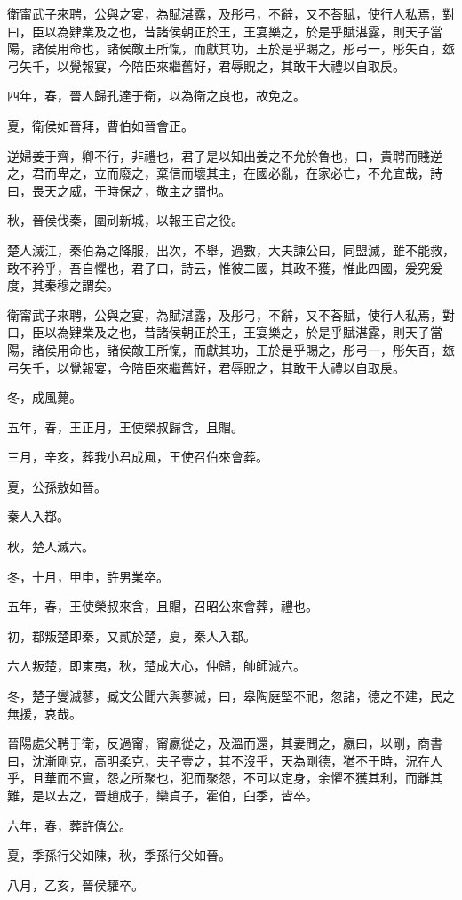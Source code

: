 \begin{pinyinscope}
衛甯武子來聘，公與之宴，為賦湛露，及彤弓，不辭，又不荅賦，使行人私焉，對曰，臣以為肄業及之也，昔諸侯朝正於王，王宴樂之，於是乎賦湛露，則天子當陽，諸侯用命也，諸侯敵王所愾，而獻其功，王於是乎賜之，彤弓一，彤矢百，玈弓矢千，以覺報宴，今陪臣來繼舊好，君辱貺之，其敢干大禮以自取戾。

四年，春，晉人歸孔達于衛，以為衛之良也，故免之。

夏，衛侯如晉拜，曹伯如晉會正。

逆婦姜于齊，卿不行，非禮也，君子是以知出姜之不允於魯也，曰，貴聘而賤逆之，君而卑之，立而廢之，棄信而壞其主，在國必亂，在家必亡，不允宜哉，詩曰，畏天之威，于時保之，敬主之謂也。

秋，晉侯伐秦，圍刓新城，以報王官之役。

楚人滅江，秦伯為之降服，出次，不舉，過數，大夫諫公曰，同盟滅，雖不能救，敢不矜乎，吾自懼也，君子曰，詩云，惟彼二國，其政不獲，惟此四國，爰究爰度，其秦穆之謂矣。

衛甯武子來聘，公與之宴，為賦湛露，及彤弓，不辭，又不荅賦，使行人私焉，對曰，臣以為肄業及之也，昔諸侯朝正於王，王宴樂之，於是乎賦湛露，則天子當陽，諸侯用命也，諸侯敵王所愾，而獻其功，王於是乎賜之，彤弓一，彤矢百，玈弓矢千，以覺報宴，今陪臣來繼舊好，君辱貺之，其敢干大禮以自取戾。

冬，成風薨。

五年，春，王正月，王使榮叔歸含，且賵。

三月，辛亥，葬我小君成風，王使召伯來會葬。

夏，公孫敖如晉。

秦人入鄀。

秋，楚人滅六。

冬，十月，甲申，許男業卒。

五年，春，王使榮叔來含，且賵，召昭公來會葬，禮也。

初，鄀叛楚即秦，又貳於楚，夏，秦人入鄀。

六人叛楚，即東夷，秋，楚成大心，仲歸，帥師滅六。

冬，楚子燮滅蓼，臧文公聞六與蓼滅，曰，皋陶庭堅不祀，忽諸，德之不建，民之無援，哀哉。

晉陽處父聘于衛，反過甯，甯嬴從之，及溫而還，其妻問之，嬴曰，以剛，商書曰，沈漸剛克，高明柔克，夫子壹之，其不沒乎，天為剛德，猶不于時，況在人乎，且華而不實，怨之所聚也，犯而聚怨，不可以定身，余懼不獲其利，而離其難，是以去之，晉趙成子，欒貞子，霍伯，臼季，皆卒。

六年，春，葬許僖公。

夏，季孫行父如陳，秋，季孫行父如晉。

八月，乙亥，晉侯驩卒。


\end{pinyinscope}
